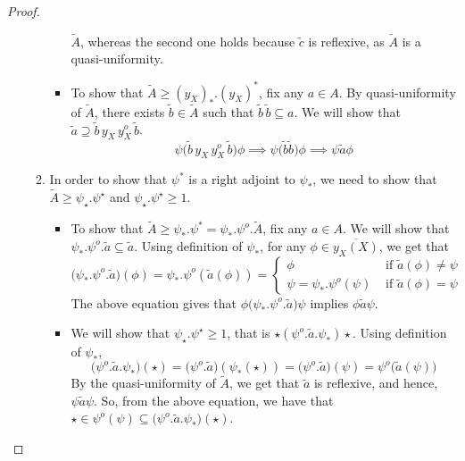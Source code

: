 \documentclass[18pt,a4paper]{article}
\theoremstyle{definition}
\begin{document}
\begin{proof}
\begin{enumerate}[label=(\roman*)]
\begin{enumerate}[label=\Roman*]
\begin{itemize}
								$\tilde{A}$, whereas the second one holds because $\tilde{c}$ is reflexive, as $\tilde{A}$ is a
								quasi-uniformity.
							\item To show that $\tilde{A} \geq (y_X^{})_*.(y_X^{})^*$, fix any $a\in A$. By
								quasi-uniformity of $\tilde{A}$, there exists $\tilde{b}\in \tilde{A}$ such that
								$\tilde{b} \, \tilde{b} \subseteq a$. We will show that $\tilde{a} \supseteq
								\tilde{b}\,y_X^{} \, y_X^{o} \, \tilde{b} $.
								\[ \psi \big(\tilde{b}\,y_X^{} \, y_X^{o} \, \tilde{b} \big) \phi
								\implies \psi \big( \tilde{b} \tilde{b} \big) \phi \implies \psi \tilde{a} \phi\]


						\end{itemize}

					\item In order to show that
						$\psi^*$ is a right adjoint to $\psi_*$,
						we need to show that
						$\tilde{A} \geq \psi_\star.\psi^\star $ and
$\psi_\star.\psi^\star \geq 1$.
\begin{itemize}
	\item To show that $\tilde{A}\geq \psi_*.\psi^*=\psi_*.\psi^o.\tilde{A} $,
		fix any $a\in A$. We will show that $\psi_*.\psi^o.\tilde{a} \subseteq \tilde{a}$.
		Using definition of $\psi_*$, for any $\phi \in \overline{y_X^{}(X)}$, we get that
		\[\big(\psi_*.\psi^o.\tilde{a}\big)(\phi)=
	\psi_*.\psi^o(\tilde{a}(\phi))= \begin{cases}
		\phi &\text{ if }\tilde{a} (\phi)\neq \psi \\
		\psi=\psi_*.\psi^o(\psi) &\text{ if } \tilde{a} (\phi)=\psi
	\end{cases}\]
	The above equation gives that $\phi\big(\psi_*.\psi^o.\tilde{a}\big)\psi$ implies
	$\phi \tilde{a} \psi$.
\item We will show that $\psi_\star.\psi^\star \geq 1$, that is
	$\star(\psi^o.\tilde{a} .\psi_*)\star$. Using definition of $\psi_*$,
	\[\big(\psi^o.\tilde{a} .\psi_*\big)(\star)=\big(\psi^o.\tilde{a}\big) (\psi_*(\star))
	= \big( \psi^o.\tilde{a} \big) (\psi)=\psi^o \big( \tilde{a}(\psi)  \big) \]
	By the quasi-uniformity of $\tilde{A}$, we get that $\tilde{a}$ is reflexive, and hence,
	$\psi \tilde{a} \psi$. So, from the above equation, we have that
	$\star \in \psi^o(\psi) \subseteq \big(\psi^o.\tilde{a} .\psi_*\big)(\star) $.
\end{itemize}
				\end{enumerate}
				\newpage


\end{enumerate}
\end{proof}
\end{document}
